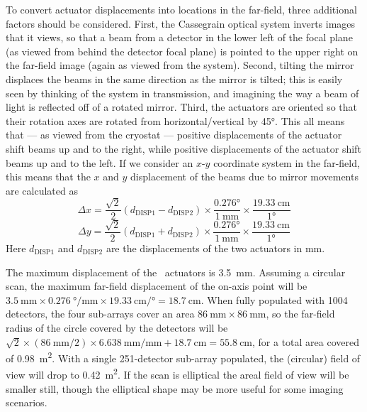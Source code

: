 To convert actuator displacements into locations in the far-field, three additional factors should be considered.
First, the Cassegrain optical system inverts images that it views, so that a beam from a detector in the lower left of the focal plane (as viewed from behind the detector focal plane) is pointed to the upper right on the far-field image (again as viewed from the system).
Second, tilting the mirror displaces the beams in the same direction as the mirror is tilted; this is easily seen by thinking of the system in transmission, and imagining the way a beam of light is reflected off of a rotated mirror.
Third, the actuators are oriented so that their rotation axes are rotated from horizontal/vertical by \ang{45}.
This all means that --- as viewed from the cryostat --- positive displacements of the  actuator shift beams up and to the right, while positive displacements of the  actuator shift beams up and to the left.
If we consider an $x$-$y$ coordinate system in the far-field, this means that the $x$ and $y$ displacement of the beams due to mirror movements are calculated as
\begin{equation} \label{eqn:ch5-bose-to-x}
\Delta x = \frac{\sqrt{2}}{2} \left( d_{\text{DISP1}} - d_{\text{DISP2}} \right) \times
    \frac{\ang{0.276}} {\SI{1}{\mm}} \times
    \frac{\SI{19.33}{\cm}} {\ang{1}}
\end{equation}
\begin{equation} \label{eqn:ch5-bose-to-y}
\Delta y = \frac{\sqrt{2}}{2} \left( d_{\text{DISP1}} + d_{\text{DISP2}} \right) \times
    \frac{\ang{0.276}} {\SI{1}{\mm}} \times
    \frac{\SI{19.33}{\cm}} {\ang{1}}
\end{equation}
Here $d_{\text{DISP1}}$ and $d_{\text{DISP2}}$ are the displacements of the two actuators in \si{\mm}.

The maximum displacement of the \BOSE\ actuators is \SI{3.5}{\mm}.
Assuming a circular scan, the maximum far-field displacement of the on-axis point will be $\SI{3.5}{\mm} \times \SI[per-mode=symbol]{0.276}{\degree\per\mm} \times \SI[per-mode=symbol]{19.33}{\cm\per\degree} = \SI{18.7}{\cm}$.
When fully populated with 1004 detectors, the four sub-arrays cover an area $\SI{86}{\mm} \times \SI{86}{\mm}$, so the far-field radius of the circle covered by the detectors will be $\sqrt{2} \times (\SI{86}{\mm}/2) \times \SI{6.638}{\mm\per\mm} + \SI{18.7}{\cm} = \SI{55.8}{\cm}$, for a total area covered of \SI{.98}{\m^2}.
With a single 251-detector sub-array populated, the (circular) field of view will drop to \SI{0.42}{\m^2}.
If the scan is elliptical the areal field of view will be smaller still, though the elliptical shape may be more useful for some imaging scenarios.

